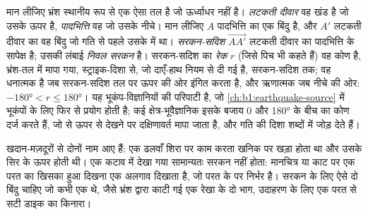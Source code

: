 \begin{definition}
\label{def:b1:faults-folds-fabrics:fault-elements}
मान लीजिए भ्रंश स्थानीय रूप से एक ऐसा तल है जो ऊर्ध्वाधर नहीं है। \emph{लटकती दीवार} वह खंड है जो उसके ऊपर है, \emph{पादभित्ति} वह जो उसके नीचे। मान लीजिए $A$ पादभित्ति का एक बिंदु है, और $A'$ लटकती दीवार का वह बिंदु जो गति से पहले उसके  में था। \emph{सरकन-सदिश} $\overrightarrow{AA'}$ लटकती दीवार का पादभित्ति के सापेक्ष  है; उसकी लंबाई \emph{निवल सरकन} है। सरकन-सदिश का \emph{रेक} $r$ (जिसे पिच भी कहते हैं) वह कोण है, भ्रंश-तल में मापा गया, स्ट्राइक-दिशा से, जो दाएँ-हाथ नियम से दी गई है, सरकन-सदिश तक; वह धनात्मक है जब सरकन-सदिश तल पर ऊपर की ओर इंगित करता है, और ऋणात्मक जब नीचे की ओर: $\ang{-180} < r \le \ang{180}$। यह भूकंप-विज्ञानियों की परिपाटी है, जो \cref{ch:b1:earthquake-source} में भूकंपों के लिए फिर से प्रयोग होती है; कई क्षेत्र-भूवैज्ञानिक इसके बजाय 0 और \ang{180} के बीच का कोण दर्ज करते हैं, जो  से ऊपर से देखने पर दक्षिणावर्त मापा जाता है, और गति की दिशा शब्दों में जोड़ देते हैं।
\end{definition}

खदान-मज़दूरों से दोनों नाम आए हैं: एक ढलवाँ शिरा पर काम करता खनिक  पर खड़ा होता था और  उसके सिर के ऊपर होती थी। एक कटाव में देखा गया  सामान्यतः सरकन नहीं होता: मानचित्र या काट पर एक परत का खिसका हुआ दिखना एक अलगाव दिखाता है, जो परत के  पर निर्भर है। सरकन के लिए ऐसे दो बिंदु चाहिए जो कभी एक थे, जैसे भ्रंश द्वारा काटी गई एक रेखा के दो भाग, उदाहरण के लिए एक परत से सटी डाइक का किनारा।

